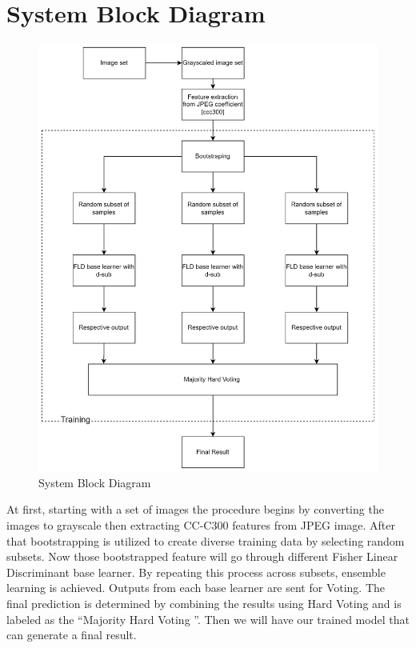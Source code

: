 \section{System Block Diagram}
\begin{figure}[H]
    \centering
    \includegraphics[width=160mm]{./img/blockDiagram.png}
    \caption{System Block Diagram}
\end{figure}
\clearpage
\begin{flushleft}
    At first, starting with a set of images the procedure begins by converting the images to grayscale then extracting CC-C300 features from JPEG image. After that bootstrapping is utilized to create diverse training data by selecting random subsets. Now those bootstrapped feature will go through different Fisher Linear Discriminant base learner. By repeating this process across subsets, ensemble learning is achieved.  Outputs from each base learner are sent for Voting. The final prediction is determined by combining the results using Hard Voting and is labeled as the ``Majority Hard Voting ''. Then we will have our trained model that can generate a final result.
\end{flushleft}
